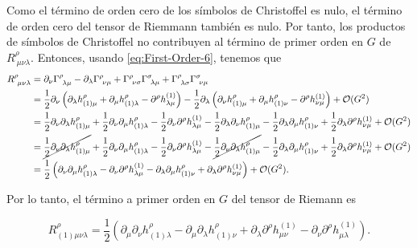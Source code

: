 \documentclass[letterpaper,11pt]{article}
\begin{document}
Como el término de orden cero de los símbolos de Christoffel es nulo, el término de orden cero del tensor de Riemmann también es nulo. Por tanto, los productos de símbolos de Christoffel no contribuyen al término de primer orden en $G$ de $R_{\ \mu\nu\lambda}^{\rho}$. Entonces, usando \eqref{eq:First-Order-6}, tenemos que
\begin{align}
R_{\ \mu\nu\lambda}^{\rho} &= \partial_{\nu} \Gamma^{\rho}_{\ \lambda \mu} - \partial_{\lambda} \Gamma^{\rho}_{\ \nu \mu} + \Gamma^{\rho}_{\ \nu\sigma} \Gamma^{\sigma}_{\ \lambda\mu} + \Gamma^{\rho}_{\ \lambda\sigma} \Gamma^{\sigma}_{\ \nu\mu} \nonumber \\
&= \frac{1}{2 }\partial_{\nu} \left(\partial_{\lambda} h_{(1)\mu}^{\rho} + \partial_{\mu} h_{(1)\lambda}^{\rho} - \partial^{\rho} h_{\lambda\mu}^{(1)} \right) - \frac{1}{2}\partial_{\lambda} \left(\partial_{\nu} h_{(1)\mu}^{\rho} + \partial_{\mu} h_{(1)\nu}^{\rho} - \partial^{\rho} h_{\nu\mu}^{(1)} \right) + \mathcal{O}(G^2) \nonumber \\
&= \frac{1}{2}\partial_{\nu} \partial_{\lambda} h_{(1)\mu}^{\rho} + \frac{1}{2}\partial_{\nu} \partial_{\mu} h_{(1)\lambda}^{\rho} - \frac{1}{2}\partial_{\nu} \partial^{\rho} h_{\lambda\mu}^{(1)} - \frac{1}{2}\partial_{\lambda} \partial_{\nu} h_{(1)\mu}^{\rho} - \frac{1}{2}\partial_{\lambda} \partial_{\mu} h_{(1)\nu}^{\rho} + \frac{1}{2}\partial_{\lambda} \partial^{\rho} h_{\nu\mu}^{(1)} + \mathcal{O}(G^2) \nonumber\\
&= \cancel{\frac{1}{2}\partial_{\nu} \partial_{\lambda} h_{(1)\mu}^{\rho}} + \frac{1}{2}\partial_{\nu} \partial_{\mu} h_{(1)\lambda}^{\rho} - \frac{1}{2}\partial_{\nu} \partial^{\rho} h_{\lambda\mu}^{(1)} - \cancel{\frac{1}{2}\partial_{\nu} \partial_{\lambda} h_{(1)\mu}^{\rho}} - \frac{1}{2}\partial_{\lambda} \partial_{\mu} h_{(1)\nu}^{\rho} + \frac{1}{2}\partial_{\lambda} \partial^{\rho} h_{\nu\mu}^{(1)} + \mathcal{O}(G^2) \nonumber\\
&= \frac{1}{2} \left(\partial_{\nu} \partial_{\mu} h_{(1)\lambda}^{\rho} - \partial_{\nu} \partial^{\rho} h_{\lambda\mu}^{(1)} -\partial_{\lambda} \partial_{\mu} h_{(1)\nu}^{\rho} + \partial_{\lambda} \partial^{\rho} h_{\nu\mu}^{(1)} \right) + \mathcal{O}(G^2). \label{eq:First-Order-7}
\end{align}

Por lo tanto, el término a primer orden en $G$ del tensor de Riemann es
\begin{shaded}
\begin{equation}
R_{(1)\mu\nu\lambda}^{\rho} = \frac{1}{2} \left(\partial_{\mu} \partial_{\nu} h_{(1)\lambda}^{\rho} -\partial_{\mu} \partial_{\lambda} h_{(1)\nu}^{\rho} + \partial_{\lambda} \partial^{\rho} h_{\mu\nu}^{(1)} - \partial_{\nu} \partial^{\rho} h_{\mu\lambda}^{(1)}  \right). \label{eq:First-Order-8}
\end{equation}
\end{shaded}
\end{document}

